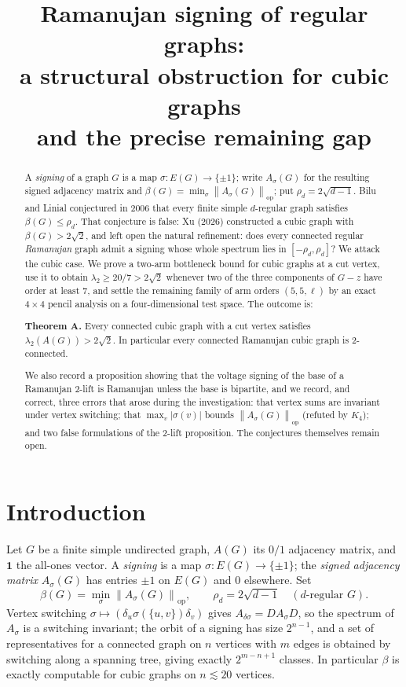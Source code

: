 \documentclass[11pt,a4paper]{article}
\title{\bf Ramanujan signing of regular graphs:\\
a structural obstruction for cubic graphs\\[2mm]
\large and the precise remaining gap}
\author{}
\date{}
\theoremstyle{plain}
\theoremstyle{definition}
\newcommand{\sgn}{\sigma}
\newcommand{\norm}[1]{\left\lVert #1\right\rVert}
\newcommand{\bdG}{A(G)}
\begin{document}
\maketitle

\begin{abstract}
A \emph{signing} of a graph $G$ is a map $\sgn\colon E(G)\to\{\pm1\}$; write
$A_{\sgn}(G)$ for the resulting signed adjacency matrix and
$\beta(G)=\min_{\sgn}\norm{A_{\sgn}(G)}_{\mathrm{op}}$; put
$\rho_d=2\sqrt{d-1}$. Bilu and Linial conjectured in 2006 that every finite
simple $d$-regular graph satisfies $\beta(G)\le\rho_d$. That conjecture is
false: Xu (2026) constructed a cubic graph with $\beta(G)>2\sqrt2$, and left
open the natural refinement: does every connected regular \emph{Ramanujan}
graph admit a signing whose whole spectrum lies in
$[-\rho_d,\rho_d]$? We attack the cubic case. We prove a two-arm bottleneck
bound for cubic graphs at a cut vertex, use it to obtain
$\lambda_2\ge 20/7>2\sqrt2$ whenever two of the three components of $G-z$ have
order at least $7$, and settle the remaining family of arm orders $(5,5,\ell)$
by an exact $4\times4$ pencil analysis on a four-dimensional test space.
The outcome is:

\medskip\noindent
\textbf{Theorem A.} Every connected cubic graph with a cut vertex satisfies
$\lambda_2(\bdG)>2\sqrt2$. In particular every connected Ramanujan cubic graph is
2-connected.

We also record a proposition showing that the voltage signing of the base of a
Ramanujan 2-lift is Ramanujan unless the base is bipartite, and we record, and
correct, three errors that arose during the investigation: that vertex sums are
invariant under vertex switching; that $\max_v|\sgn(v)|$ bounds
$\norm{A_{\sgn}(G)}_{\mathrm{op}}$ (refuted by $K_4$); and two false formulations
of the 2-lift proposition. The conjectures themselves remain open.
\end{abstract}

\section{Introduction}

Let $G$ be a finite simple undirected graph, $A(G)$ its $0/1$ adjacency
matrix, and $\mathbf 1$ the all-ones vector. A \emph{signing} is a map
$\sgn\colon E(G)\to\{\pm1\}$; the \emph{signed adjacency matrix} $A_{\sgn}(G)$
has entries $\pm1$ on $E(G)$ and $0$ elsewhere. Set
\[
  \beta(G)=\min_{\sgn}\norm{A_{\sgn}(G)}_{\mathrm{op}},\qquad
  \rho_d=2\sqrt{d-1}\quad (d\text{-regular } G).
\]
Vertex switching $\sgn\mapsto(\delta_u\sgn(\{u,v\})\delta_v)$ gives
$A_{\delta\sgn}=DA_{\sgn}D$, so the spectrum of $A_{\sgn}$ is a switching
invariant; the orbit of a signing has size $2^{n-1}$, and a set of
representatives for a connected graph on $n$ vertices with $m$ edges is obtained
by switching along a spanning tree, giving exactly $2^{m-n+1}$ classes. In
particular $\beta$ is exactly computable for cubic graphs on $n\lesssim20$
vertices.
\end{document}
